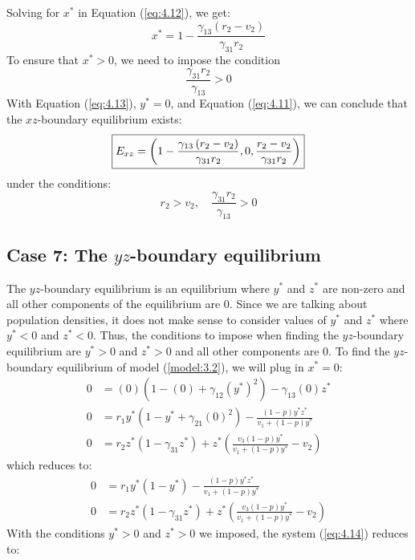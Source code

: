 Solving for $x^*$ in Equation (\ref{eq:4.12}), we get:
\begin{equation}
    x^*=1-\frac{\gamma_{13}\left(r_2-v_2\right)}{\gamma_{31}r_2}
    \label{eq:4.13}
\end{equation}
To ensure that $x^*>0$, we need to impose the condition
\[
\frac{\gamma_{31}r_2}{\gamma_{13}}>0
\]
With Equation (\ref{eq:4.13}), $y^*=0$, and Equation (\ref{eq:4.11}), we can conclude that the $xz$-boundary equilibrium exists:
\[
\fbox{$\displaystyle E_{xz}=\left(
1-\frac{\gamma_{13}\left(r_2-v_2\right)}{\gamma_{31}r_2},
0,
\frac{r_2-v_2}{\gamma_{31}r_2}
\right)$}
\]
under the conditions:
\[
r_2>v_2,\quad \frac{\gamma_{31}r_2}{\gamma_{13}}>0
\]

\subsection{Case 7: The $yz$-boundary equilibrium}\label{subsec:yz_boundary_equilibrium}
The $yz$-boundary equilibrium is an equilibrium where $y^*$ and $z^*$ are non-zero and all other components of the equilibrium are 0. Since we are talking about population densities, it does not make sense to consider values of $y^*$ and $z^*$ where $y^*<0$ and $z^*<0$. Thus, the conditions to impose when finding the $yz$-boundary equilibrium are $y^*>0$ and $z^*>0$ and all other components are 0. To find the $yz$-boundary equilibrium of model (\ref{model:3.2}), we will plug in $x^*=0$:
\begin{align*}
    0 &= (0)\left(1-(0)+\gamma_{12}\left(y^*\right)^2\right)-\gamma_{13}(0)z^*\\
    0 &= r_1y^*\left(1-y^*+\gamma_{21}(0)^2\right)-\frac{\left(1-p\right)y^*z^*}{v_1+\left(1-p\right)y^*}\\
    0 &= r_2z^*\left(1-\gamma_{31}z^*\right)+z^*\left(\frac{v_3\left(1-p\right)y^*}{v_1+\left(1-p\right)y^*}-v_2\right)
\end{align*}
which reduces to:
\begin{subequations}
    \begin{align}
        0 &= r_1y^*\left(1-y^*\right)-\frac{\left(1-p\right)y^*z^*}{v_1+\left(1-p\right)y^*}
        \label{eq:4.14a}\\
        0 &= r_2z^*\left(1-\gamma_{31}z^*\right)+z^*\left(\frac{v_3\left(1-p\right)y^*}{v_1+\left(1-p\right)y^*}-v_2\right)
        \label{eq:4.14b}
    \end{align}
    \label{eq:4.14}
\end{subequations}
With the conditions $y^*>0$ and $z^*>0$ we imposed, the system (\ref{eq:4.14}) reduces to:
